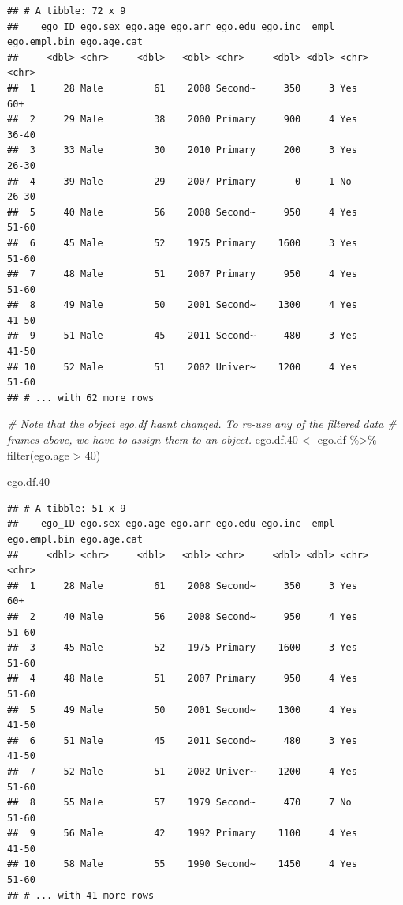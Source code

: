 \documentclass[
]{book}
\newenvironment{Shaded}{\begin{snugshade}}{\end{snugshade}}
\newcommand{\CommentTok}[1]{\textcolor[rgb]{0.56,0.35,0.01}{\textit{#1}}}
\newcommand{\DecValTok}[1]{\textcolor[rgb]{0.00,0.00,0.81}{#1}}
\newcommand{\FloatTok}[1]{\textcolor[rgb]{0.00,0.00,0.81}{#1}}
\newcommand{\FunctionTok}[1]{\textcolor[rgb]{0.00,0.00,0.00}{#1}}
\newcommand{\NormalTok}[1]{#1}
\newcommand{\OtherTok}[1]{\textcolor[rgb]{0.56,0.35,0.01}{#1}}
\newcommand{\SpecialCharTok}[1]{\textcolor[rgb]{0.00,0.00,0.00}{#1}}
\begin{document}
\begin{verbatim}
## # A tibble: 72 x 9
##    ego_ID ego.sex ego.age ego.arr ego.edu ego.inc  empl ego.empl.bin ego.age.cat
##     <dbl> <chr>     <dbl>   <dbl> <chr>     <dbl> <dbl> <chr>        <chr>      
##  1     28 Male         61    2008 Second~     350     3 Yes          60+        
##  2     29 Male         38    2000 Primary     900     4 Yes          36-40      
##  3     33 Male         30    2010 Primary     200     3 Yes          26-30      
##  4     39 Male         29    2007 Primary       0     1 No           26-30      
##  5     40 Male         56    2008 Second~     950     4 Yes          51-60      
##  6     45 Male         52    1975 Primary    1600     3 Yes          51-60      
##  7     48 Male         51    2007 Primary     950     4 Yes          51-60      
##  8     49 Male         50    2001 Second~    1300     4 Yes          41-50      
##  9     51 Male         45    2011 Second~     480     3 Yes          41-50      
## 10     52 Male         51    2002 Univer~    1200     4 Yes          51-60      
## # ... with 62 more rows
\end{verbatim}

\begin{Shaded}
\begin{Highlighting}[]
\CommentTok{\# Note that the object ego.df hasn\textquotesingle{}t changed. To re{-}use any of the filtered data}
\CommentTok{\# frames above, we have to assign them to an object.}
\NormalTok{ego.df}\FloatTok{.40} \OtherTok{\textless{}{-}}\NormalTok{ ego.df }\SpecialCharTok{\%\textgreater{}\%}
  \FunctionTok{filter}\NormalTok{(ego.age }\SpecialCharTok{\textgreater{}} \DecValTok{40}\NormalTok{)}

\NormalTok{ego.df}\FloatTok{.40}
\end{Highlighting}
\end{Shaded}

\begin{verbatim}
## # A tibble: 51 x 9
##    ego_ID ego.sex ego.age ego.arr ego.edu ego.inc  empl ego.empl.bin ego.age.cat
##     <dbl> <chr>     <dbl>   <dbl> <chr>     <dbl> <dbl> <chr>        <chr>      
##  1     28 Male         61    2008 Second~     350     3 Yes          60+        
##  2     40 Male         56    2008 Second~     950     4 Yes          51-60      
##  3     45 Male         52    1975 Primary    1600     3 Yes          51-60      
##  4     48 Male         51    2007 Primary     950     4 Yes          51-60      
##  5     49 Male         50    2001 Second~    1300     4 Yes          41-50      
##  6     51 Male         45    2011 Second~     480     3 Yes          41-50      
##  7     52 Male         51    2002 Univer~    1200     4 Yes          51-60      
##  8     55 Male         57    1979 Second~     470     7 No           51-60      
##  9     56 Male         42    1992 Primary    1100     4 Yes          41-50      
## 10     58 Male         55    1990 Second~    1450     4 Yes          51-60      
## # ... with 41 more rows
\end{verbatim}
\end{document}
